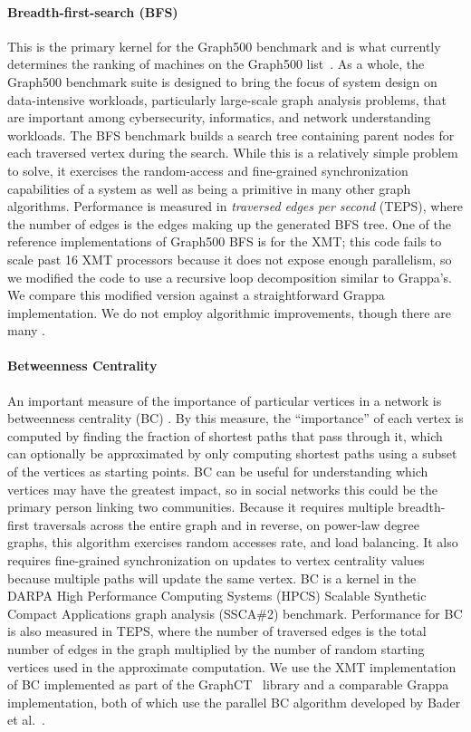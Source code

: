 \paragraph{Breadth-first-search (BFS)}
This is the primary kernel for the Graph500 benchmark and is what currently determines the ranking of machines on the Graph500 list~\cite{graph500list}. As a whole, the Graph500 benchmark suite is designed to bring the focus of system design on data-intensive workloads, particularly large-scale graph analysis problems, that are important among cybersecurity, informatics, and network understanding workloads. The BFS benchmark builds a search tree containing parent nodes for each traversed vertex during the search.  While this is a relatively simple problem to solve, it exercises the random-access and fine-grained synchronization capabilities of a system as well as being a primitive in many other graph algorithms. Performance is measured in \emph{traversed edges per second} (TEPS), where the number of edges is the edges making up the generated BFS tree. One of the reference implementations of Graph500 BFS is for the XMT; this code fails to scale past 16 XMT processors because it does not expose enough parallelism, so we modified the code to use a recursive loop decomposition similar to Grappa's. We compare this modified version against a straightforward Grappa implementation. We do not employ algorithmic improvements, though there are many \cite{Beamer:Graph500,Yoo:FixedPointGraph500}.

\paragraph{Betweenness Centrality}
An important measure of the importance of particular vertices in a network is betweenness centrality (BC) \cite{freeman1979centrality}. By this measure, the ``importance'' of each vertex is computed by finding the fraction of shortest paths that pass through it, which can optionally be approximated by only computing shortest paths using a subset of the vertices as starting points. BC can be useful for understanding which vertices may have the greatest impact, so in social networks this could be the primary person linking two communities. Because it requires multiple breadth-first traversals across the entire graph and in reverse, on power-law degree graphs, this algorithm exercises random accesses rate, and load balancing. It also requires fine-grained synchronization on updates to vertex centrality values because multiple paths will update the same vertex. BC is a kernel in the DARPA High Performance Computing Systems (HPCS) Scalable Synthetic Compact Applications graph analysis (SSCA\#2) benchmark\cite{ssca2}. Performance for BC is also measured in TEPS, where the number of traversed edges is the total number of edges in the graph multiplied by the number of random starting vertices used in the approximate computation. We use the XMT implementation of BC implemented as part of the GraphCT~\cite{GraphCT} library and a comparable Grappa implementation, both of which use the parallel BC algorithm developed by Bader et al.~\cite{bader:bc}.
